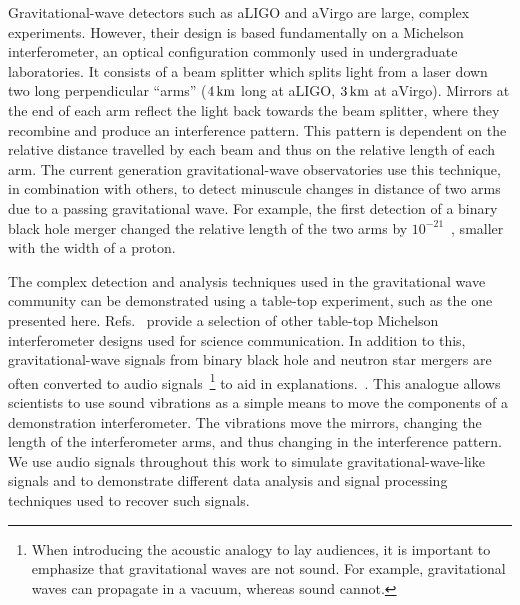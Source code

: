 \documentclass[paper-main.tex]{subfiles}
\begin{document}
Gravitational-wave detectors such as aLIGO and aVirgo are large, complex experiments. However, their design is based fundamentally on a Michelson interferometer, an optical configuration commonly used in undergraduate laboratories.
It consists of a beam splitter which splits light from a laser down two long perpendicular ``arms'' ($4\,{\rm km}$ long at aLIGO, $3\,{\rm km}$ at aVirgo).
Mirrors at the end of each arm reflect the light back towards the beam splitter, where they recombine and produce an interference pattern.
This pattern is dependent on the relative distance travelled by each beam and thus on the relative length of each arm. The current generation gravitational-wave observatories use this technique, in combination with others, to detect minuscule changes in distance of two arms due to a passing gravitational wave.
For example, the first detection of a binary black hole merger changed the relative length of the two arms by $10^{-21}$~\cite{GW150914}, smaller with the width of a proton.


The complex detection and analysis techniques used in the gravitational wave community can be demonstrated using a table-top experiment, such as the one presented here.
Refs.~\cite{TTExhibit:2020,TTExhibit:online,AMIGO:online,ThorLabsIFO,LIGOIFOGlue,LIGOIFOMagnets,FoxEtAl:1999} provide a selection of other table-top Michelson interferometer designs used for science communication. 
In addition to this, gravitational-wave signals from binary black hole and neutron star mergers are often converted to audio signals~\footnote{When introducing the acoustic analogy to lay audiences, it is important to emphasize that gravitational waves are not sound. For example, gravitational waves can propagate in a vacuum, whereas sound cannot.} to aid in explanations.~\cite{SoundsOfSpaceTime:online,BlackHoleHunter:online}.
This analogue allows scientists to use sound vibrations as a simple means to move the components of a demonstration interferometer. The vibrations move the mirrors, changing the length of the interferometer arms, and thus changing in the interference pattern.
We use audio signals throughout this work to simulate gravitational-wave-like signals and to demonstrate different data analysis and signal processing techniques used to recover such signals.
\end{document}
